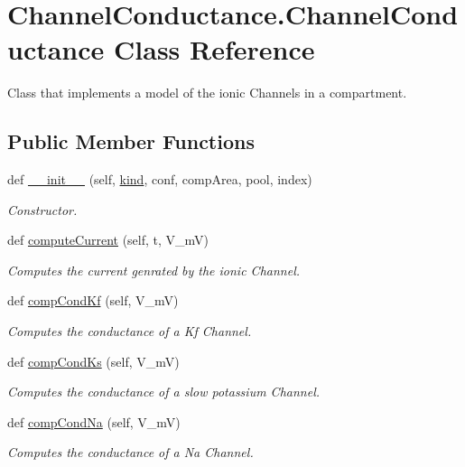 \hypertarget{class_channel_conductance_1_1_channel_conductance}{}\section{Channel\+Conductance.\+Channel\+Conductance Class Reference}
\label{class_channel_conductance_1_1_channel_conductance}


Class that implements a model of the ionic Channels in a compartment.  


\subsection*{Public Member Functions}
\begin{DoxyCompactItemize}
\item 
def \hyperlink{class_channel_conductance_1_1_channel_conductance_a25b3a53d3d4a2926f61e1bd978e375f7}{\+\_\+\+\_\+init\+\_\+\+\_\+} (self, \hyperlink{class_channel_conductance_1_1_channel_conductance_a7bf3e28aab2160014358cde589f2ec39}{kind}, conf, comp\+Area, pool, index)
\begin{DoxyCompactList}\small\item\em Constructor. \end{DoxyCompactList}\item 
def \hyperlink{class_channel_conductance_1_1_channel_conductance_af012b0816d74d6bb6a923ca79dc0a7ba}{compute\+Current} (self, t, V\+\_\+mV)
\begin{DoxyCompactList}\small\item\em Computes the current genrated by the ionic Channel. \end{DoxyCompactList}\item 
def \hyperlink{class_channel_conductance_1_1_channel_conductance_a9df028286b0ce594530f798f4a781d8c}{comp\+Cond\+Kf} (self, V\+\_\+mV)
\begin{DoxyCompactList}\small\item\em Computes the conductance of a Kf Channel. \end{DoxyCompactList}\item 
def \hyperlink{class_channel_conductance_1_1_channel_conductance_aaffacf12bc9b5f50bfcc04f49c3254ff}{comp\+Cond\+Ks} (self, V\+\_\+mV)
\begin{DoxyCompactList}\small\item\em Computes the conductance of a slow potassium Channel. \end{DoxyCompactList}\item 
def \hyperlink{class_channel_conductance_1_1_channel_conductance_a17d6343152d9252b6f1368b450f0dbcf}{comp\+Cond\+Na} (self, V\+\_\+mV)
\begin{DoxyCompactList}\small\item\em Computes the conductance of a Na Channel. \end{DoxyCompactList}\end{DoxyCompactItemize}
